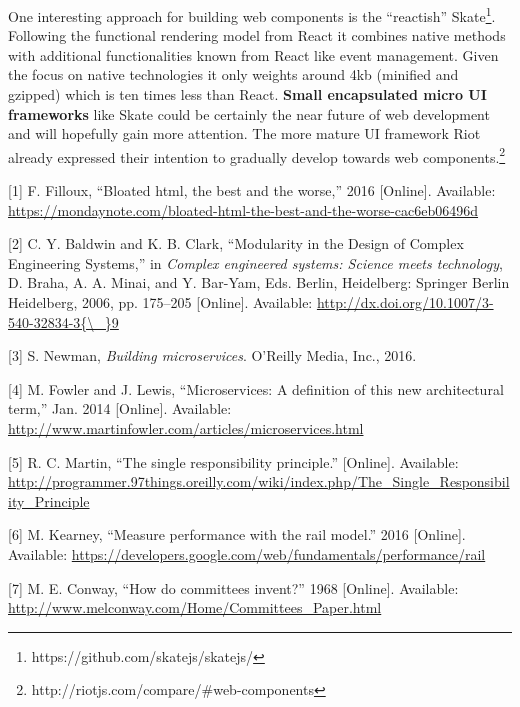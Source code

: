 \documentclass[]{article}
\begin{document}
One interesting approach for building web components is the ``reactish''
Skate\footnote{https://github.com/skatejs/skatejs/}. Following the
functional rendering model from React it combines native methods with
additional functionalities known from React like event management. Given
the focus on native technologies it only weights around 4kb (minified
and gzipped) which is ten times less than React. \textbf{Small
encapsulated micro UI frameworks} like Skate could be certainly the near
future of web development and will hopefully gain more attention. The
more mature UI framework Riot already expressed their intention to
gradually develop towards web components.\footnote{http://riotjs.com/compare/\#web-components}

\hypertarget{refs}{}
\hypertarget{ref-Filloux2016}{}
{[}1{]} F. Filloux, ``Bloated html, the best and the worse,'' 2016
{[}Online{]}. Available:
\url{https://mondaynote.com/bloated-html-the-best-and-the-worse-cac6eb06496d}

\hypertarget{ref-Baldwin2006}{}
{[}2{]} C. Y. Baldwin and K. B. Clark, ``Modularity in the Design of
Complex Engineering Systems,'' in \emph{Complex engineered systems:
Science meets technology}, D. Braha, A. A. Minai, and Y. Bar-Yam, Eds.
Berlin, Heidelberg: Springer Berlin Heidelberg, 2006, pp. 175--205
{[}Online{]}. Available:
\href{http://dx.doi.org/10.1007/3-540-32834-3\%7B/_\%7D9}{http://dx.doi.org/10.1007/3-540-32834-3\{\textbackslash{}\_\}9}

\hypertarget{ref-Newman2015}{}
{[}3{]} S. Newman, \emph{Building microservices}. O'Reilly Media, Inc.,
2016.

\hypertarget{ref-Fowler2014}{}
{[}4{]} M. Fowler and J. Lewis, ``Microservices: A definition of this
new architectural term,'' Jan. 2014 {[}Online{]}. Available:
\url{http://www.martinfowler.com/articles/microservices.html}

\hypertarget{ref-Martin}{}
{[}5{]} R. C. Martin, ``The single responsibility principle.''
{[}Online{]}. Available:
\url{http://programmer.97things.oreilly.com/wiki/index.php/The_Single_Responsibility_Principle}

\hypertarget{ref-Kearney2016}{}
{[}6{]} M. Kearney, ``Measure performance with the rail model.'' 2016
{[}Online{]}. Available:
\url{https://developers.google.com/web/fundamentals/performance/rail}

\hypertarget{ref-Conway1968}{}
{[}7{]} M. E. Conway, ``How do committees invent?'' 1968 {[}Online{]}.
Available: \url{http://www.melconway.com/Home/Committees_Paper.html}
\end{document}
